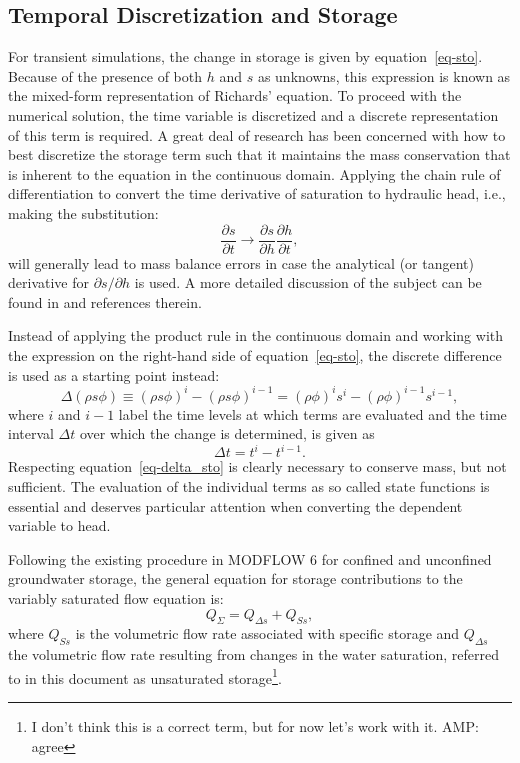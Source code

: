 \documentclass[fleqn]{article}
\begin{document}
\subsection{Temporal Discretization and Storage}
For transient simulations, the change in storage is given by
equation~\ref{eq-sto}. Because of the presence of both $h$ and
$s$ as unknowns, this expression is known as the mixed-form
representation of Richards' equation. To proceed with the
numerical solution, the time variable is discretized and a
discrete representation of this term is required. 
A great deal of research has been concerned with how to 
best discretize the storage term such that it maintains
the mass conservation that is inherent to the equation in
the continuous domain. Applying the chain rule of differentiation
to convert the time derivative of saturation to hydraulic head,
i.e., making the substitution:
\begin{equation}
  \frac{\partial s}{\partial t} \rightarrow
  \frac{\partial s}{\partial h}
  \frac{\partial h}{\partial t},
  \label{eq-sat-chain-rule}
\end{equation}
will generally lead to mass balance errors in case the analytical
(or tangent) derivative for $\partial s/\partial h$ is used. 
A more detailed discussion of the subject can be found in
\cite{rathfelder-1994} and references therein.

Instead of applying the product rule in the continuous domain
and working with the expression on the right-hand side of 
equation~\ref{eq-sto}, the discrete difference is used
as a starting point instead:
\begin{equation}
  \Delta \left ( \rho s \phi \right ) \equiv
  \left ( \rho s \phi \right )^{i} - 
  \left ( \rho s \phi \right )^{i-1} =
  \left ( \rho \phi \right )^{i} s^{i} - 
  \left ( \rho \phi \right )^{i-1} s^{i-1},
  \label{eq-delta_sto}
\end{equation}
where $i$ and $i-1$ label the time levels at which terms
are evaluated and the time interval $\Delta t$ over which the 
change is determined, is given as
\begin{equation}
  \Delta t = t^i - t^{i-1}.
\end{equation}
Respecting equation~\ref{eq-delta_sto} is clearly necessary to conserve
mass, but not sufficient. The evaluation of the individual terms
as so called state functions is essential and deserves particular
attention when converting the dependent variable to head.

Following the existing procedure in MODFLOW 6 for confined and
unconfined groundwater storage, the general equation for storage
contributions to the variably saturated flow equation is:
\begin{equation}
  Q_{\Sigma} = Q_{\Delta s} + Q_{Ss},
\end{equation}
where $Q_{Ss}$ is the volumetric flow rate associated with specific
storage and $Q_{\Delta s}$ the volumetric flow rate resulting from
changes in the water saturation, referred to in this document
as unsaturated storage\footnote{
  I don't think this is a correct term,
  but for now let's work with it. AMP: agree
}.
\end{document}
